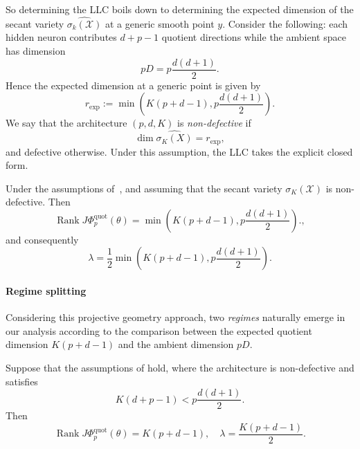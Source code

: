 So determining the LLC boils down to determining the expected dimension of the secant variety $\widehat{\sigma_{k}(\mathcal X)}$ at a generic smooth point $y$.
Consider the following: each hidden neuron contributes $d+p-1$ quotient directions while the ambient space has dimension
\begin{equation}
    pD = p \frac{d(d+1)}{2}.
\end{equation}
Hence the expected dimension at a generic point is given by
\begin{equation}
    r_{\textrm{exp}} := \min \left( K(p+d-1), p \frac{d(d+1)}{2} \right).
\end{equation}
We say that the architecture $(p,d,K)$ is \textit{non-defective} if
\begin{equation}
    \dim \widehat{\sigma_{K}(X)} = r_{\textrm{exp}},
\end{equation}
and defective otherwise.
Under this assumption, the LLC takes the explicit closed form.
\begin{corollary}\label{cor: generic LLC}
    Under the assumptions of~, and assuming that the secant variety $\sigma_{K}(\mathcal X)$ is non-defective.
    Then
    \begin{equation}
        \operatorname{Rank} J \Phi_{p}^{\operatorname{quot}}(\theta) = \min \left( K(p+d-1), p \frac{d(d+1)}{2} \right).,
    \end{equation}
    and consequently
    \begin{equation}
        \lambda = \frac{1}{2} \min \left( K(p+d-1), p \frac{d(d+1)}{2} \right).
    \end{equation}    
\end{corollary}

\paragraph{Regime splitting}
Considering this projective geometry approach, two \textit{regimes} naturally emerge in our analysis according to the comparison between the expected quotient dimension $K(p+d-1)$ and the ambient dimension $pD$.

\begin{corollary}
    Suppose that the assumptions of  hold, where the architecture is non-defective and satisfies
    \begin{equation}
        K(d+p-1) < p \frac{d(d+1)}{2}.
    \end{equation}
    Then
    \begin{equation}
        \operatorname{Rank} J \Phi_{p}^{\operatorname{quot}}(\theta) = K(p+d-1), \quad \lambda = \frac{K(p+d-1)}{2}.
    \end{equation}
\end{corollary}

